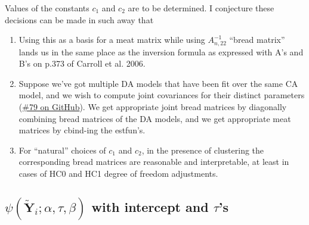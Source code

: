 \documentclass{article}
\begin{document}
Values of the constants $c_{1}$ and $c_{2}$ are to be determined.
I conjecture these decisions can be made in such away that 
\begin{enumerate}
\item Using this as a basis for a meat matrix while using
  $A_{n,22}^{-1}$  ``bread matrix'' lands us in the same place as the
  inversion formula as expressed with A's and B's on p.373 of Carroll
  et al. 2006.
\item Suppose we've got multiple DA models that have been fit over the
  same CA model, and we wish to compute joint covariances for their
  distinct parameters
  (\href{https://github.com/benbhansen-stats/flexida/issues/79}{\#79
    on GitHub}). We get appropriate joint bread matrices by
  diagonally combining bread matrices of the DA models, and we get
  appropriate meat matrices by cbind-ing the estfun's.
\item For ``natural'' choices of $c_{1}$ and $c_{2}$, in the
  presence of clustering the corresponding bread matrices are
  reasonable and interpretable, at least in cases of HC0 and HC1
  degree of freedom adjustments. 
\end{enumerate}

\subsection{$\psi(\tilde{\mathbf{Y}}_{i};
  \alpha, \tau, \beta)$ with intercept and $\tau$'s}
\label{sec:psit-rho_0-tau}
\end{document}
